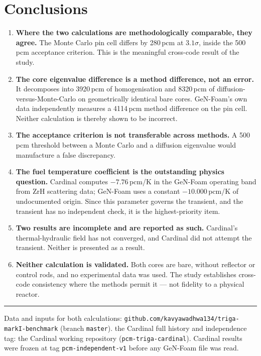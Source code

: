 \documentclass[11pt,a4paper]{article}
\newcommand{\pcm}{\,pcm}
\begin{document}
\section{Conclusions}
\begin{enumerate}\itemsep4pt
\item \textbf{Where the two calculations are methodologically comparable, they agree.} The
Monte Carlo pin cell differs by 280\pcm{} at $3.1\sigma$, inside the
500\pcm{} acceptance criterion. This is the meaningful cross-code result of the study.

\item \textbf{The core eigenvalue difference is a method difference, not an error.} It
decomposes into 3920\pcm{} of homogenisation and 8320\pcm{} of
diffusion-versus-Monte-Carlo on geometrically identical bare cores. GeN-Foam's own data
independently measures a 4114\pcm{} method difference on the pin cell. Neither
calculation is thereby shown to be incorrect.

\item \textbf{The acceptance criterion is not transferable across methods.} A
500\pcm{} threshold between a Monte Carlo and a diffusion eigenvalue would
manufacture a false discrepancy.

\item \textbf{The fuel temperature coefficient is the outstanding physics question.} Cardinal
computes $-7.76$\,pcm/K in the GeN-Foam operating band from ZrH scattering data; GeN-Foam uses a constant
$-10.000$\,pcm/K of undocumented origin. Since this parameter governs the transient, and the
transient has no independent check, it is the highest-priority item.

\item \textbf{Two results are incomplete and are reported as such.} Cardinal's thermal-hydraulic
field has not converged, and Cardinal did not attempt the transient. Neither is presented as a
result.

\item \textbf{Neither calculation is validated.} Both cores are bare, without reflector or
control rods, and no experimental data was used. The study establishes cross-code
consistency where the methods permit it --- not fidelity to a physical reactor.
\end{enumerate}

\vspace{5mm}\hrule\vspace{2mm}
\footnotesize\color{ink2}
Data and inputs for both calculations:
\texttt{github.com/kavyawadhwa134/triga-markI-benchmark} (branch \texttt{master}).
the Cardinal full history and independence tag: the Cardinal working repository (\texttt{pcm-triga-cardinal}).
Cardinal results were frozen at tag \texttt{pcm-independent-v1} before any GeN-Foam file was read.
\end{document}
